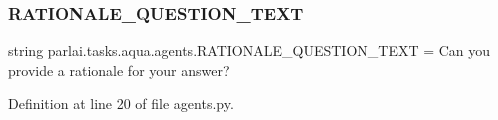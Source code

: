\subsubsection{\texorpdfstring{R\+A\+T\+I\+O\+N\+A\+L\+E\+\_\+\+Q\+U\+E\+S\+T\+I\+O\+N\+\_\+\+T\+E\+XT}{RATIONALE\_QUESTION\_TEXT}}
{\footnotesize\ttfamily string parlai.\+tasks.\+aqua.\+agents.\+R\+A\+T\+I\+O\+N\+A\+L\+E\+\_\+\+Q\+U\+E\+S\+T\+I\+O\+N\+\_\+\+T\+E\+XT = \textquotesingle{}Can you provide a rationale for your answer?\textquotesingle{}}



Definition at line 20 of file agents.\+py.

